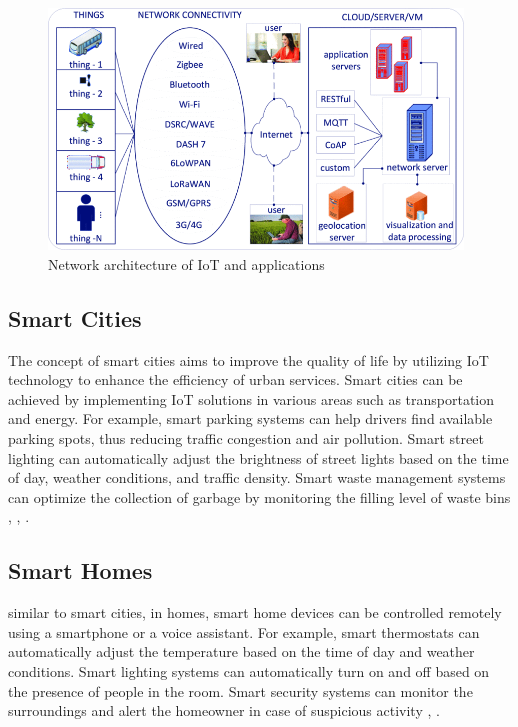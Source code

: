 \begin{figure}[h!]
    \centering
    \includegraphics[width=0.98\textwidth]{pict/iot-architecture.png}
    \caption{Network architecture of IoT and applications \cite{iot-overview}}
    \label{fig:iot-architecture}
\end{figure}

\subsection*{Smart Cities}
The concept of smart cities aims to improve the quality of life by utilizing IoT technology to enhance the efficiency of urban services. Smart cities can be achieved by implementing IoT solutions in various areas such as transportation and energy. For example, smart parking systems can help drivers find available parking spots, thus reducing traffic congestion and air pollution. Smart street lighting can automatically adjust the brightness of street lights based on the time of day, weather conditions, and traffic density. Smart waste management systems can optimize the collection of garbage by monitoring the
filling level of waste bins \cite{ibm-iot}, \cite{javapoint-iot}, \cite{iot-overview}.

\subsection*{Smart Homes} 
similar to smart cities, in homes, smart home devices can be controlled remotely using a smartphone or a voice assistant. For example, smart thermostats can automatically adjust the temperature based on the time of day and weather conditions. Smart lighting systems can automatically turn on and off based on the presence of people in the room. Smart security systems can monitor the surroundings and alert the homeowner in case of suspicious activity \cite{javapoint-iot}, \cite{iot-overview}. 

